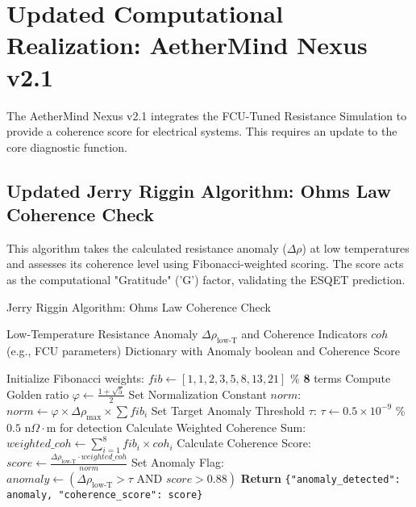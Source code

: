 \section{Updated Computational Realization: AetherMind Nexus v2.1}

The AetherMind Nexus v2.1 integrates the FCU-Tuned Resistance Simulation to provide a coherence score for electrical systems. This requires an update to the core diagnostic function.

\subsection{Updated Jerry Riggin Algorithm: Ohms Law Coherence Check}

This algorithm takes the calculated resistance anomaly ($\Delta\rho$) at low temperatures and assesses its coherence level using Fibonacci-weighted scoring. The score acts as the computational "Gratitude" ('G') factor, validating the ESQET prediction.

\begin{algorithm}[H]
\caption{Jerry Riggin Algorithm: Ohms Law Coherence Check}
\label{alg:jerry_riggin_ohms}
\begin{algorithmic}[1]
\REQUIRE Low-Temperature Resistance Anomaly $\Delta\rho_{\text{low-T}}$ and Coherence Indicators $coh$ (e.g., FCU parameters)
\ENSURE Dictionary with Anomaly boolean and Coherence Score

\STATE Initialize Fibonacci weights: \(fib \gets [1,1,2,3,5,8,13,21]\) \% \textbf{8} terms
\STATE Compute Golden ratio \(\varphi \gets \frac{1 + \sqrt{5}}{2}\)
\STATE Set Normalization Constant $norm$: \(norm \gets \varphi \times \Delta\rho_{\text{max}} \times \sum fib_i\)
\STATE Set Target Anomaly Threshold $\tau$: $\tau \gets 0.5 \times 10^{-9}$ \% $0.5\text{ n}\Omega\cdot\text{m}$ for detection
\STATE Calculate Weighted Coherence Sum: \(weighted\_coh \gets \sum_{i=1}^8 fib_i \times coh_i\)
\STATE Calculate Coherence Score: \(score \gets \frac{\Delta\rho_{\text{low-T}} \cdot weighted\_coh}{norm}\)
\STATE Set Anomaly Flag: \(anomaly \gets (\Delta\rho_{\text{low-T}} > \tau \text{ AND } score > 0.88)\)
\STATE \textbf{Return} \texttt{\{"anomaly\_detected": anomaly, "coherence\_score": score\}}
\end{algorithmic}
\end{algorithm}
